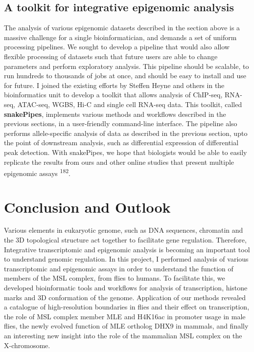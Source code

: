 \documentclass[11pt,twoside]{MPIthesis}
\theoremstyle{definition}
\theoremstyle{definition}
\theoremstyle{definition}
\theoremstyle{remark}
\begin{document}
\subsection{A toolkit for integrative epigenomic
analysis}\label{a-toolkit-for-integrative-epigenomic-analysis}

The analysis of various epigenomic datasets described in the section
above is a massive challenge for a single bioinformatician, and demands
a set of uniform processing pipelines. We sought to develop a pipeline
that would also allow flexible processing of datasets such that future
users are able to change parameters and perform exploratory analysis.
This pipeline should be scalable, to run hundreds to thousands of jobs
at once, and should be easy to install and use for future. I joined the
existing efforts by Steffen Heyne and others in the bioinformatics unit
to develop a toolkit that allows analysis of ChIP-seq, RNA-seq,
ATAC-seq, WGBS, Hi-C and single cell RNA-seq data. This toolkit, called
\textbf{snakePipes}, implements various methods and workflows described
in the previous sections, in a user-friendly command-line interface. The
pipeline also performs allele-specific analysis of data as described in
the previous section, upto the point of downstream analysis, such as
differential expression of differential peak detection. With snakePipes,
we hope that biologists would be able to easily replicate the results
from ours and other online studies that present multiple epigenomic
assays \textsuperscript{182}.

\section{Conclusion and Outlook}\label{conclusion-and-outlook}

Various elements in eukaryotic genome, such as DNA sequences, chromatin
and the 3D topological structure act together to facilitate gene
regulation. Therefore, Integrative transcriptomic and epigenomic
analysis is becoming an important tool to understand genomic regulation.
In this project, I performed analysis of various transcriptomic and
epigenomic assays in order to understand the function of members of the
MSL complex, from flies to humans. To facilitate this, we developed
bioinformatic tools and workflows for analysis of transcription, histone
marks and 3D conformation of the genome. Application of our methods
revealed a catalogue of high-resolution boundaries in flies and their
effect on transcription, the role of MSL complex member MLE and H4K16ac
in promoter usage in male flies, the newly evolved function of MLE
ortholog DHX9 in mammals, and finally an interesting new insight into
the role of the mammalian MSL complex on the X-chromosome.
\end{document}
